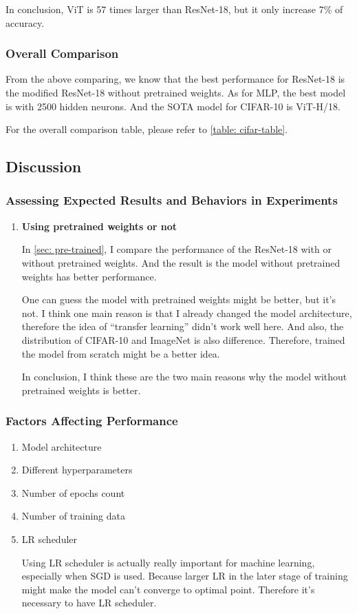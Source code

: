 \documentclass[twocolumn, draft]{extarticle}
\begin{document}
In conclusion, ViT is 57 times larger than ResNet-18, but it only increase 7\% of accuracy.

\subsubsection{Overall Comparison}

From the above comparing, we know that the best performance for ResNet-18 is the modified ResNet-18 without pretrained weights. As for MLP, the best model is with 2500 hidden neurons. And the SOTA model for CIFAR-10 is ViT-H/18. 

For the overall comparison table, please refer to \autoref{table: cifar-table}.

\subsection{Discussion}

\subsubsection{Assessing Expected Results and Behaviors in Experiments}\label{sec: discuss-1}

\begin{enumerate}
\item \textbf{Using pretrained weights or not}

In \ref{sec: pre-trained}, I compare the performance of the ResNet-18 with or without pretrained weights. And the result is the model without pretrained weights has better performance.

One can guess the model with pretrained weights might be better, but it's not. I think one main reason is that I already changed the model architecture, therefore the idea of ``transfer learning'' didn't work well here. And also, the distribution of CIFAR-10 and ImageNet is also difference. Therefore, trained the model from scratch might be a better idea.

In conclusion, I think these are the two main reasons why the model without pretrained weights is better.

\end{enumerate}

\subsubsection{Factors Affecting Performance}

\begin{enumerate}
\item Model architecture
\item Different hyperparameters
\item Number of epochs count
\item Number of training data
\item LR scheduler

Using LR scheduler is actually really important for machine learning, especially when SGD is used. Because larger LR in the later stage of training might make the model can't converge to optimal point. Therefore it's necessary to have LR scheduler.
\end{enumerate}
\end{document}
